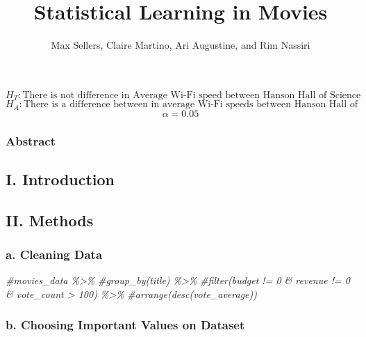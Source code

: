 \documentclass[
]{article}
\title{Statistical Learning in Movies}
\author{Max Sellers, Claire Martino, Ari Augustine, and Rim Nassiri}
\date{}
\newenvironment{Shaded}{\begin{snugshade}}{\end{snugshade}}
\newcommand{\CommentTok}[1]{\textcolor[rgb]{0.56,0.35,0.01}{\textit{#1}}}
\begin{document}
\maketitle

\[H_T: \textrm{There is not difference in Average Wi-Fi speed between Hanson Hall of Science and Old Main.}\]
\[H_A: \textrm{There is a difference between in average Wi-Fi speeds between Hanson Hall of Science and Old main.}\]
\[\alpha=0.05\]

\hypertarget{abstract}{%
\subsubsection{Abstract}\label{abstract}}

\hypertarget{i.-introduction}{%
\subsection{I. Introduction}\label{i.-introduction}}

\hypertarget{ii.-methods}{%
\subsection{II. Methods}\label{ii.-methods}}

\hypertarget{a.-cleaning-data}{%
\subsubsection{a. Cleaning Data}\label{a.-cleaning-data}}

\begin{Shaded}
\begin{Highlighting}[]
\CommentTok{\#movies\_data \%\textgreater{}\%}
  \CommentTok{\#group\_by(title) \%\textgreater{}\%}
  \CommentTok{\#filter(budget != 0 \& revenue != 0 \& vote\_count \textgreater{} 100) \%\textgreater{}\%}
  \CommentTok{\#arrange(desc(vote\_average))}
\end{Highlighting}
\end{Shaded}

\hypertarget{b.-choosing-important-values-on-dataset}{%
\subsubsection{b. Choosing Important Values on
Dataset}\label{b.-choosing-important-values-on-dataset}}
\end{document}
